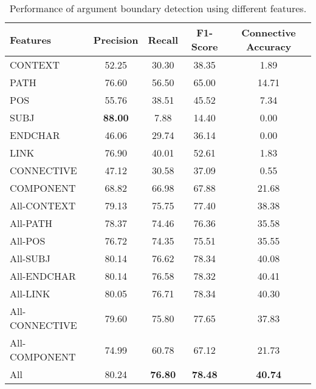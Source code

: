 \begin{table}[ht]
\centering
\begin{tabular}{|l|c|c|c|c|}
\hline

    Features        &     Precision &     Recall &     F1-Score &     Connective Accuracy \\ \hline
    CONTEXT         &     52.25     &     30.30  &     38.35    &      1.89               \\ \hline
    PATH            &     76.60     &     56.50  &     65.00    &     14.71               \\ \hline
    POS             &     55.76     &     38.51  &     45.52    &      7.34               \\ \hline
    SUBJ            & \bf 88.00     &      7.88  &     14.40    &      0.00               \\ \hline
    ENDCHAR         &     46.06     &     29.74  &     36.14    &      0.00               \\ \hline
    LINK            &     76.90     &     40.01  &     52.61    &      1.83               \\ \hline
    CONNECTIVE      &     47.12     &     30.58  &     37.09    &      0.55               \\ \hline
    COMPONENT       &     68.82     &     66.98  &     67.88    &     21.68               \\ \hline
    All-CONTEXT     &     79.13     &     75.75  &     77.40    &     38.38               \\ \hline
    All-PATH        &     78.37     &     74.46  &     76.36    &     35.58               \\ \hline
    All-POS         &     76.72     &     74.35  &     75.51    &     35.55               \\ \hline
    All-SUBJ        &     80.14     &     76.62  &     78.34    &     40.08               \\ \hline
    All-ENDCHAR     &     80.14     &     76.58  &     78.32    &     40.41               \\ \hline
    All-LINK        &     80.05     &     76.71  &     78.34    &     40.30               \\ \hline
    All-CONNECTIVE  &     79.60     &     75.80  &     77.65    &     37.83               \\ \hline
    All-COMPONENT   &     74.99     &     60.78  &     67.12    &     21.73               \\ \hline
    All             &     80.24     & \bf 76.80  & \bf 78.48    & \bf 40.74               \\ \hline

\end{tabular}
\caption{\label{t:argument-features} Performance of argument boundary detection
using different features. }
\end{table}
